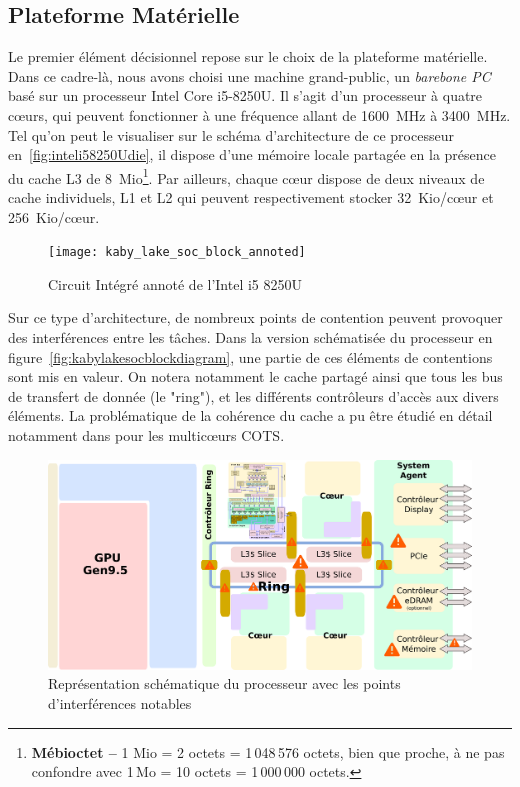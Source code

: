 \documentclass[french, a4paper, 11pt, twoside, pdftex]{StyleThese}
\begin{document}
        \subsection{Plateforme Matérielle}
        	Le premier élément décisionnel repose sur le choix de la plateforme matérielle. Dans ce cadre-là, nous avons choisi une machine grand-public, un \textit{barebone PC} basé sur un processeur Intel Core i5-8250U. Il s'agit d'un processeur à quatre cœurs, qui peuvent fonctionner à une fréquence allant de 1600~MHz à 3400~MHz. Tel qu'on peut le visualiser sur le schéma d'architecture de ce processeur en~\autoref{fig:inteli58250Udie}, il dispose d'une mémoire locale partagée en la présence du cache L3 de 8~Mio\footnote{\textbf{Mébioctet -- }1 Mio = 2 octets = 1\,048\,576 octets, bien que proche, à ne pas confondre avec 1\,Mo = 10 octets = 1\,000\,000 octets.}. Par ailleurs, chaque cœur dispose de deux niveaux de cache individuels, L1 et L2 qui peuvent respectivement stocker 32~Kio/cœur et 256~Kio/cœur. 
       	\begin{figure}[ht]
       		\centering
       		\texttt{[image: kaby\_lake\_soc\_block\_annoted]} %
       		\caption{Circuit Intégré annoté de l'Intel i5 8250U}
       		\label{fig:inteli58250Udie}
       	\end{figure}
       
        	Sur ce type d'architecture, de nombreux points de contention peuvent provoquer des interférences entre les tâches. Dans la version schématisée du processeur en figure~\autoref{fig:kabylakesocblockdiagram}, une partie de ces éléments de contentions sont mis en valeur. On notera notamment le cache partagé ainsi que tous les bus de transfert de donnée (le "ring"), et les différents contrôleurs d'accès aux divers éléments. La problématique de la cohérence du cache a pu être étudié en détail notamment dans \cite{boniol_identification_2019} pour les multicœurs COTS.
        	
		\begin{figure}[ht]
			\centering
			\includegraphics[width=\linewidth]{schemas/kaby_lake_soc_block_diagram}
			\captionsetup{justification=centering}
			\caption{Représentation schématique du processeur avec les points d'interférences notables}
			\label{fig:kabylakesocblockdiagram}
		\end{figure}
	
\end{document}
